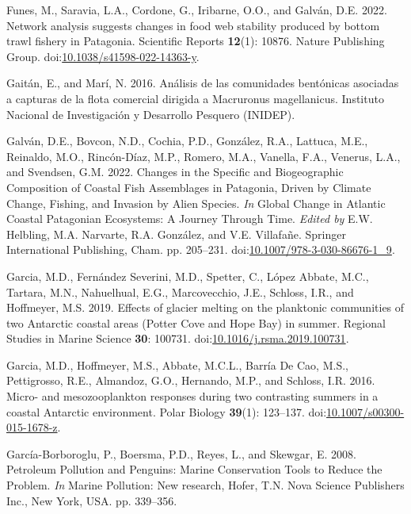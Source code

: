 \documentclass[
]{article}
\newlength{\cslhangindent}
\newenvironment{CSLReferences}[2] %
 {\begin{list}{}{%
  \setlength{\itemindent}{0pt}
  \setlength{\leftmargin}{0pt}
  \setlength{\parsep}{0pt}
  \ifodd #1
   \setlength{\leftmargin}{\cslhangindent}
   \setlength{\itemindent}{-1\cslhangindent}
  \fi
  \setlength{\itemsep}{#2\baselineskip}}}
 {\end{list}}
\begin{document}
\begin{CSLReferences}{1}{0}
Funes, M., Saravia, L.A., Cordone, G., Iribarne, O.O., and Galván, D.E.
2022. Network analysis suggests changes in food web stability produced
by bottom trawl fishery in {Patagonia}. Scientific Reports
\textbf{12}(1): 10876. Nature Publishing Group.
doi:\href{https://doi.org/10.1038/s41598-022-14363-y}{10.1038/s41598-022-14363-y}.

Gaitán, E., and Marí, N. 2016. {An{á}lisis de las comunidades
bent{ó}nicas asociadas a capturas de la flota comercial dirigida a
Macruronus magellanicus}. Instituto Nacional de Investigaci{ó}n y
Desarrollo Pesquero (INIDEP).

Galván, D.E., Bovcon, N.D., Cochia, P.D., González, R.A., Lattuca, M.E.,
Reinaldo, M.O., Rincón-Díaz, M.P., Romero, M.A., Vanella, F.A., Venerus,
L.A., and Svendsen, G.M. 2022. Changes in the {Specific} and
{Biogeographic Composition} of {Coastal Fish Assemblages} in
{Patagonia}, {Driven} by {Climate Change}, {Fishing}, and {Invasion} by
{Alien Species}. \emph{In} Global {Change} in {Atlantic Coastal
Patagonian Ecosystems}: {A Journey Through Time}. \emph{Edited by} E.W.
Helbling, M.A. Narvarte, R.A. González, and V.E. Villafañe. Springer
International Publishing, Cham. pp. 205--231.
doi:\href{https://doi.org/10.1007/978-3-030-86676-1_9}{10.1007/978-3-030-86676-1\_9}.

Garcia, M.D., Fernández Severini, M.D., Spetter, C., López Abbate, M.C.,
Tartara, M.N., Nahuelhual, E.G., Marcovecchio, J.E., Schloss, I.R., and
Hoffmeyer, M.S. 2019. Effects of glacier melting on the planktonic
communities of two {Antarctic} coastal areas ({Potter Cove} and {Hope
Bay}) in summer. Regional Studies in Marine Science \textbf{30}: 100731.
doi:\href{https://doi.org/10.1016/j.rsma.2019.100731}{10.1016/j.rsma.2019.100731}.

Garcia, M.D., Hoffmeyer, M.S., Abbate, M.C.L., Barría De Cao, M.S.,
Pettigrosso, R.E., Almandoz, G.O., Hernando, M.P., and Schloss, I.R.
2016. Micro- and mesozooplankton responses during two contrasting
summers in a coastal {Antarctic} environment. Polar Biology
\textbf{39}(1): 123--137.
doi:\href{https://doi.org/10.1007/s00300-015-1678-z}{10.1007/s00300-015-1678-z}.

García-Borboroglu, P., Boersma, P.D., Reyes, L., and Skewgar, E. 2008.
Petroleum {Pollution} and {Penguins}: {Marine Conservation Tools} to
{Reduce} the {Problem}. \emph{In} Marine {Pollution}: {New} research,
Hofer, T.N. Nova Science Publishers Inc., New York, USA. pp. 339--356.


\end{CSLReferences}
\end{document}
